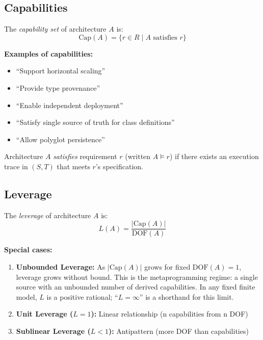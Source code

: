 \subsection{Capabilities}

\begin{definition}\label{def:capabilities}
The \emph{capability set} of architecture $A$ is:
\[
\text{Cap}(A) = \{r \in R \mid A \text{ satisfies } r\}
\]
\end{definition}

\textbf{Examples of capabilities:}
\begin{itemize}
\item ``Support horizontal scaling''
\item ``Provide type provenance''
\item ``Enable independent deployment''
\item ``Satisfy single source of truth for class definitions''
\item ``Allow polyglot persistence''
\end{itemize}

\begin{definition}\label{def:satisfies}
Architecture $A$ \emph{satisfies} requirement $r$ (written $A \vDash r$) if there exists an execution trace in $(S, T)$ that meets $r$'s specification.
\end{definition}

\subsection{Leverage}

\begin{definition}[Leverage]\label{def:leverage}
The \emph{leverage} of architecture $A$ is:
\[
L(A) = \frac{|\text{Cap}(A)|}{\text{DOF}(A)}
\]
\end{definition}

\textbf{Special cases:}
\begin{enumerate}
\item \textbf{Unbounded Leverage:} As $|\text{Cap}(A)|$ grows for fixed $\text{DOF}(A) = 1$, leverage grows without bound. This is the metaprogramming regime: a single source with an unbounded number of derived capabilities. In any fixed finite model, $L$ is a positive rational; ``$L = \infty$'' is a shorthand for this limit.
\item \textbf{Unit Leverage ($L = 1$):} Linear relationship (n capabilities from n DOF)
\item \textbf{Sublinear Leverage ($L < 1$):} Antipattern (more DOF than capabilities)
\end{enumerate}

